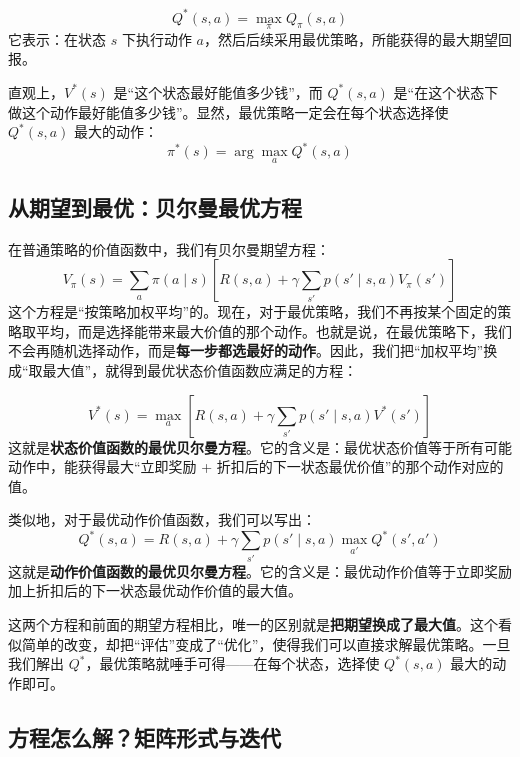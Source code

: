 \documentclass[lang=cn,zihao=-4,a4paper,fontset=windows]{beautybook}
\begin{document}
\begin{definition}[][最优动作价值函数 $Q^*(s,a)$]
\[
Q^*(s,a) = \max_{\pi} Q_\pi(s,a)
\]
它表示：在状态 $s$ 下执行动作 $a$，然后后续采用最优策略，所能获得的最大期望回报。
\end{definition}

直观上，$V^*(s)$ 是“这个状态最好能值多少钱”，而 $Q^*(s,a)$ 是“在这个状态下做这个动作最好能值多少钱”。显然，最优策略一定会在每个状态选择使 $Q^*(s,a)$ 最大的动作：
\[
\pi^*(s) = \arg\max_{a} Q^*(s,a)
\]

\subsection{从期望到最优：贝尔曼最优方程}

在普通策略的价值函数中，我们有贝尔曼期望方程：
\[
V_\pi(s) = \sum_a \pi(a\mid s) \left[ R(s,a) + \gamma \sum_{s'} p(s'\mid s,a) V_\pi(s') \right]
\]
这个方程是“按策略加权平均”的。现在，对于最优策略，我们不再按某个固定的策略取平均，而是选择能带来最大价值的那个动作。也就是说，在最优策略下，我们不会再随机选择动作，而是\textbf{每一步都选最好的动作}。因此，我们把“加权平均”换成“取最大值”，就得到最优状态价值函数应满足的方程：

\[
V^*(s) = \max_{a} \left[ R(s,a) + \gamma \sum_{s'} p(s'\mid s,a) V^*(s') \right]
\]
这就是\textbf{状态价值函数的最优贝尔曼方程}。它的含义是：最优状态价值等于所有可能动作中，能获得最大“立即奖励 + 折扣后的下一状态最优价值”的那个动作对应的值。

类似地，对于最优动作价值函数，我们可以写出：
\[
Q^*(s,a) = R(s,a) + \gamma \sum_{s'} p(s'\mid s,a) \max_{a'} Q^*(s',a')
\]
这就是\textbf{动作价值函数的最优贝尔曼方程}。它的含义是：最优动作价值等于立即奖励加上折扣后的下一状态最优动作价值的最大值。

这两个方程和前面的期望方程相比，唯一的区别就是\textbf{把期望换成了最大值}。这个看似简单的改变，却把“评估”变成了“优化”，使得我们可以直接求解最优策略。一旦我们解出 $Q^*$，最优策略就唾手可得——在每个状态，选择使 $Q^*(s,a)$ 最大的动作即可。

\subsection{方程怎么解？矩阵形式与迭代}
\end{document}
